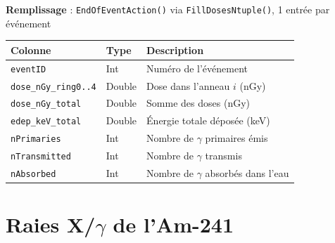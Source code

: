 \documentclass[11pt,a4paper]{article}
\newcommand{\code}[1]{\texttt{#1}}
\begin{document}
\textbf{Remplissage} : \code{EndOfEventAction()} via \code{FillDosesNtuple()}, 1 entrée par événement

\begin{table}[h]
\centering
\begin{tabular}{p{4cm} p{2cm} p{7.5cm}}
    \toprule
    \rowcolor{headerblue!20}
    \textbf{Colonne} & \textbf{Type} & \textbf{Description} \\
    \midrule
    \code{eventID} & Int & Numéro de l'événement \\
    \rowcolor{lightgray}
    \code{dose\_nGy\_ring0..4} & Double & Dose dans l'anneau $i$ (nGy) \\
    \code{dose\_nGy\_total} & Double & Somme des doses (nGy) \\
    \rowcolor{lightgray}
    \code{edep\_keV\_total} & Double & Énergie totale déposée (keV) \\
    \code{nPrimaries} & Int & Nombre de $\gamma$ primaires émis \\
    \rowcolor{lightgray}
    \code{nTransmitted} & Int & Nombre de $\gamma$ transmis \\
    \code{nAbsorbed} & Int & Nombre de $\gamma$ absorbés dans l'eau \\
    \bottomrule
\end{tabular}
\end{table}

\section{Raies X/$\gamma$ de l'Am-241}
\end{document}
